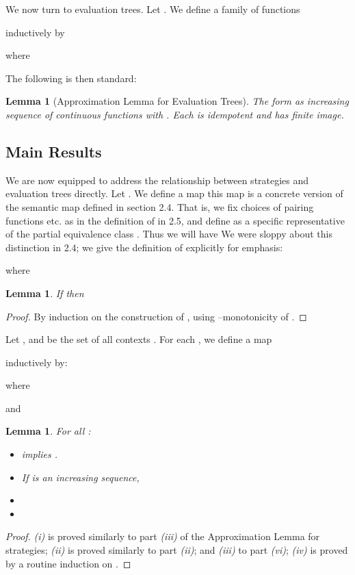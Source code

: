 \documentclass[11pt]{article}
\newtheorem{lemma}[theorem]{Lemma}
\begin{document}
We now turn to evaluation trees. Let
. We define a family of functions

inductively by



where



The following is then standard:
\begin{lemma}[Approximation Lemma for Evaluation Trees]\label{alet}
The  form as increasing sequence of
continuous functions with . Each  is idempotent and has finite
image.
\end{lemma}

\subsection{Main Results}
We are now equipped to address the relationship between strategies
and evaluation trees directly. Let .
We define a map  this map is a concrete version of
the semantic map defined in section 2.4. That is, we fix choices
of pairing functions etc. as in the definition of  in 2.5,
and define  as a specific
representative of the partial equivalence class . Thus we will have  We were sloppy about this
distinction in 2.4; we give the definition of 
explicitly for emphasis:

where


\begin{lemma}\label{lemmm1}
If  then 
\end{lemma}
\begin{proof} By induction on the construction of , using
--monotonicity  of .
\end{proof}

Let , and  be the set of
all contexts .
For each , we define a map

inductively by:




where

and


\begin{lemma}\label{lemmm2}
For all  :
\begin{itemize}
\item[(i)]  implies
   .
\item[(ii)] If  is an
  increasing sequence,

\item[(iii)] 
\item[(iv)] 
\end{itemize}
\end{lemma}
\begin{proof} {\it (i)} is proved similarly to part {\it (iii)} of
the Approximation Lemma for strategies; {\it (ii)} is proved
similarly to part {\it (ii)}; and {\it (iii)} to part {\it (vi)};
{\it (iv)} is proved by a routine induction on .
\end{proof}
\end{document}
